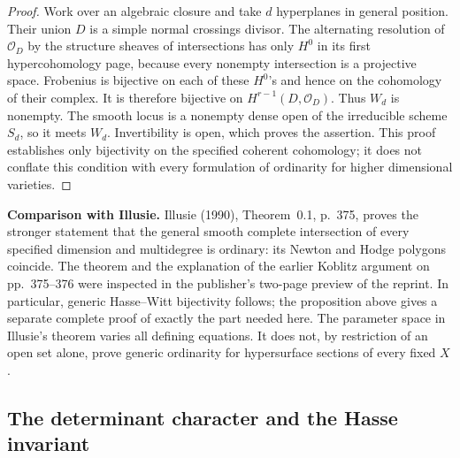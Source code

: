 \begin{proof}
Work over an algebraic closure and take $d$ hyperplanes in general
position.  Their union $D$ is a simple normal crossings divisor.
The alternating resolution of $\mathcal O_D$ by the structure sheaves
of intersections has only $H^0$ in its first hypercohomology page,
because every nonempty intersection is a projective space.  Frobenius
is bijective on each of these $H^0$'s and hence on the cohomology of
their complex.  It is therefore bijective on
$H^{r-1}(D,\mathcal O_D)$.  Thus $W_d$ is nonempty.  The smooth locus
is a nonempty dense open of the irreducible scheme $S_d$, so it meets
$W_d$.  Invertibility is open, which proves the assertion.  This proof
establishes only bijectivity on the specified coherent cohomology;
it does not conflate this condition with every formulation of
ordinarity for higher dimensional varieties.
\end{proof}

\par\smallskip\noindent\textbf{Comparison with Illusie.}
Illusie (1990), Theorem~0.1, p.~375, proves the stronger statement that
the general smooth complete intersection of every specified dimension
and multidegree is ordinary: its Newton and Hodge polygons coincide.
The theorem and the explanation of the earlier Koblitz argument on
pp.~375--376 were inspected in the publisher's two-page preview of
the reprint.  In particular, generic Hasse--Witt bijectivity follows;
the proposition above gives a separate complete proof of exactly the
part needed here.  The parameter space in Illusie's theorem varies all
defining equations.  It does not, by restriction of an open set alone,
prove generic ordinarity for hypersurface sections of every fixed $X$.

\subsection{The determinant character and the Hasse invariant}
\label{subsec:hasse-determinant}

